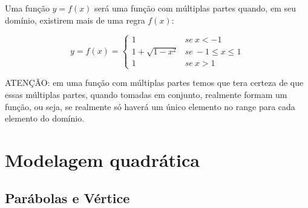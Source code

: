 \documentclass[pdftex, brazil, 12pt, twoside]{article}
\begin{document}
Uma função $y=f(x)$ será uma função com múltiplas partes quando, em seu domínio,
existirem mais de uma regra $f(x)$:

\begin{equation}
  y = f(x) =
  \begin{cases} 
      1                & se\ x < -1 \\
      1 + \sqrt{1-x^2} & se\ -1 \leq x \leq 1 \\
      1                & se\ x > 1
  \end{cases}
\end{equation}

ATENÇÃO: em uma função com múltiplas partes temos que tera certeza de que essas
múltiplas partes, quando tomadas em conjunto, realmente formam um função, ou seja,
se realmente só haverá um único elemento no range para cada elemento do domínio.




\section{Modelagem quadrática}
\label{modelagem-quadratica}

\subsection{Parábolas e Vértice}
\label{modelagem-quadratica-parabolas}





\end{document}

